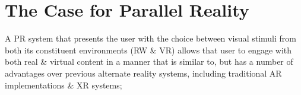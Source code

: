 







\section{The Case for Parallel Reality}
\label{caseforpr}

A PR system that presents the user with the choice between visual stimuli from both its constituent environments (RW \& VR) allows that user to engage with both real \& virtual content in a manner that is similar to, but has a number of advantages over previous alternate reality systems, including traditional AR implementations \& XR systems;


